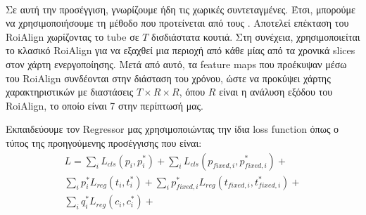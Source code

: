 \paragraph{}
Σε αυτή την προσέγγιση, γνωρίζουμε ήδη τις χωρικές συντεταγμένες. Έτσι, μπορούμε να χρησιμοποιήσουμε τη μέθοδο που προτείνεται από τους \en\cite{DBLP:journals/corr/abs-1712-09184}\gr. Αποτελεί
επέκταση του \en RoiAlign \gr χωρίζοντας το \en tube \gr σε $T$ δισδιάστατα κουτιά. Στη συνέχεια, χρησιμοποιείται το  κλασικό \en RoiAlign \gr για να εξαχθεί  μια περιοχή από κάθε μίας από τα 
χρονικά \en slices \gr στον χάρτη ενεργοποίησης. Μετά από αυτό, τα \en feature maps \gr που προέκυψαν μέσω του \en RoiAlign \gr συνδέονται στην διάσταση του χρόνου, ώστε να προκύψει
χάρτης χαρακτηριστικών με διαστάσεις $T \times R \times R$,  όπου $R $ είναι η ανάλυση εξόδου του \en RoiAlign\gr, το οποίο είναι 7 στην περίπτωσή μας.  \par


Εκπαιδεύουμε τον \en Regressor \gr μας χρησιμοποιώντας την ίδια \en loss function \gr όπως ο τύπος της προηγούμενης προσέγγισης που είναι:
\begin{equation*} 
\begin{split}
 L  =  \sum_iL_{cls}(p_i, p_i^*) + \sum_iL_{cls}(p_{fixed,i}, p_{fixed,i}^*) + \\
 \sum_ip_i^*L_{reg}(t_i,t_i^*) + \sum_ip_{fixed,i}^*L_{reg}(t_{fixed,i},t_{fixed,i}^*) + \\
  \sum_iq_i^*L_{reg}(c_{i}, c_{i}^*) + \\
\end{split}
\end{equation*}

